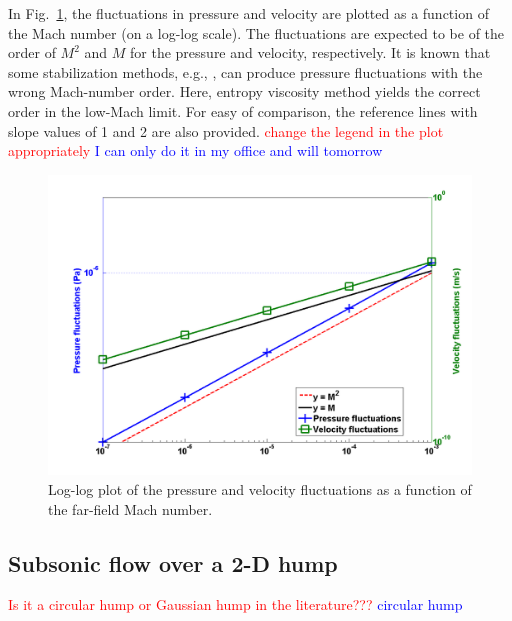 \documentclass[preprint,10pt]{elsarticle}
\newcommand{\fig}[1]{Fig.~\ref{#1}}                      %
\newcommand{\tcr}[1]{\textcolor{red}{#1}}
\newcommand{\tcb}[1]{\textcolor{blue}{#1}}
\begin{document}
%
In \fig{fig:pressure_vel_fluc}, the fluctuations in pressure and velocity are plotted as a function of the Mach number (on a log-log scale). The fluctuations are expected to be of the order of $M^2$ and $M$ for the pressure and velocity, respectively. It is known that some stabilization methods, e.g., \cite{LowMach1, LowMach2, LowMach3}, can produce pressure fluctuations with the wrong Mach-number order. Here, entropy viscosity method yields the correct order in the low-Mach limit. For easy of comparison, the reference lines with slope values of 1 and 2 are also provided. \tcr{change the legend in the plot appropriately} \tcb{I can only do it in my office and will tomorrow}
%
\begin{figure}[H]
\centering
\includegraphics[width=\textwidth]{pressure_fluctuation.png}
\caption{Log-log plot of the pressure and velocity fluctuations as a function of the far-field Mach number.}
\label{fig:pressure_vel_fluc}
\end{figure}

\subsection{Subsonic flow over a 2-D hump} \label{sec:hump}

\tcr{Is it a circular hump or Gaussian hump in the literature???} \tcb{circular hump}
\end{document}
